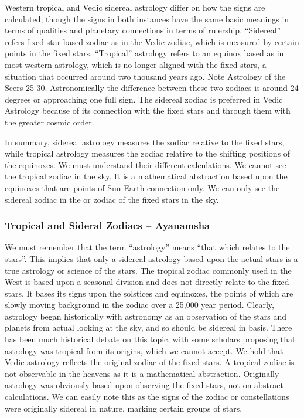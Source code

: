  

Western tropical and Vedic sidereal astrology differ on how the signs are calculated, though the signs in both instances have the same basic meanings in terms of qualities and planetary connections in terms of rulership. “Sidereal” refers fixed star based zodiac as in the Vedic zodiac, which is measured by certain points in the fixed stars. “Tropical” astrology refers to an equinox based as in most western astrology, which is no longer aligned with the fixed stars, a situation that occurred around two thousand years ago. Note Astrology of the Seers 25-30. Astronomically the difference between these two zodiacs is around 24 degrees or approaching one full sign. The sidereal zodiac is preferred in Vedic Astrology because of its connection with the fixed stars and through them with the greater cosmic order.

 

In summary, sidereal astrology measures the zodiac relative to the fixed stars, while tropical astrology measures the zodiac relative to the shifting positions of the equinoxes. We must understand their different calculations. We cannot see the tropical zodiac in the sky. It is a mathematical abstraction based upon the equinoxes that are points of Sun-Earth connection only. We can only see the sidereal zodiac in the or zodiac of the fixed stars in the sky.

 


\subsubsection{Tropical and Sideral Zodiacs – Ayanamsha}
 

We must remember that the term “astrology” means “that which relates to the stars”. This implies that only a sidereal astrology based upon the actual stars is a true astrology or science of the stars. The tropical zodiac commonly used in the West is based upon a seasonal division and does not directly relate to the fixed stars. It bases its signs upon the solstices and equinoxes, the points of which are slowly moving background in the zodiac over a 25,000 year period. Clearly, astrology began historically with astronomy as an observation of the stars and planets from actual looking at the sky, and so should be sidereal in basis. There has been much historical debate on this topic, with some scholars proposing that astrology was tropical from its origins, which we cannot accept. We hold that Vedic astrology reflects the original zodiac of the fixed stars. A tropical zodiac is not observable in the heavens as it is a mathematical abstraction. Originally astrology was obviously based upon observing the fixed stars, not on abstract calculations. We can easily note this as the signs of the zodiac or constellations were originally sidereal in nature, marking certain groups of stars.

